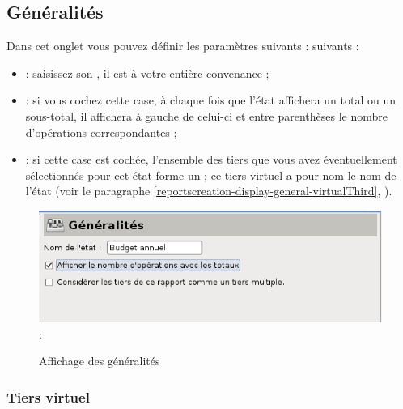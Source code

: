 \subsection{Généralités\label{reportscreation-display-general}}

Dans cet onglet vous pouvez définir les paramètres \ifIllustration suivants :
\else suivants :
\fi

\begin{itemize}
	\item  {} : saisissez son , il est à votre entière convenance ;
	\item  {} :  si vous cochez cette case, à chaque fois que l'état affichera un total ou un sous-total, il affichera à gauche de celui-ci et entre parenthèses le nombre d'opérations correspondantes ;	
	\item  {} : si cette case est cochée, l'ensemble des tiers que vous avez éventuellement sélectionnés pour cet état forme un   ; ce tiers virtuel a pour nom le nom de l'état (voir le paragraphe \vref{reportscreation-display-general-virtualThird}, ). 
\end{itemize}

\ifIllustration
\begin{figure}[htbp]
\begin{center}
\includegraphics[scale=0.5]{image/screenshot/reportcreation_display_main} :
\end{center}
\caption{Affichage des généralités}
\label{reportcreation-display-main-img}
\end{figure}
\fi


\subsubsection{Tiers virtuel\label{reportscreation-display-general-virtualThird}}


